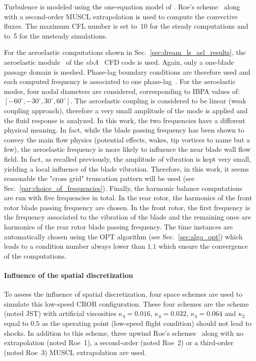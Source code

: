 Turbulence is modeled using the one-equation model of
\citet{Spalart1992}.  Roe's scheme~\cite{Roe1981} along with a 
second-order MUSCL extrapolation 
is used to compute the convective fluxes.
The maximum CFL number is set to~10 for the steady 
computations and to~5 for the unsteady simulations.

For the aeroelastic computations shown in
Sec.~\ref{sec:dream_ls_ael_results}, 
the aeroelastic module~\cite{CIDugeai2011} 
of the \textit{elsA}~\cite{Cambier2013} CFD code is used.
Again, only a one-blade passage domain is meshed.
Phase-lag boundary conditions are therefore used
and each computed frequency is associated to one phase-lag~\cite{ThesisGuedeney}.
For the aeroelastic modes, 
four nodal diameters are considered, corresponding to IBPA
values of: $[-60^\circ, -30^\circ, 30^\circ, 60^\circ]$. 
The aeroelastic coupling is considered to be linear (weak coupling
approach), therefore a very small amplitude of the mode is applied
and the fluid response is analyzed.
In this work, the two frequencies 
have a different physical meaning. In fact, while the blade passing frequency
has been shown to convey the main flow physics (potential effects, wakes, 
tip vortices to name but a few), the aeroelastic frequency is more likely
to influence the near blade wall flow field. In fact, as recalled
previously, the amplitude of vibration is kept very small,
yielding a local influence of the blade vibration.
Therefore, in this work, it seems reasonable the "cross grid"
truncation pattern will be used (see Sec.~\ref{par:choice_of_frequencies}).
Finally, the harmonic balance computations are run with
five frequencies in total. In the rear rotor,
the harmonics of the front rotor blade passing frequency
are chosen. In the front rotor, the first frequency is the
frequency associated to the vibration of the blade and the
remaining ones are harmonics of the rear rotor blade 
passing frequency.
The time instances are automatically chosen using the OPT
algorithm (see Sec.~\ref{sec:algo_opt}) which leads to 
a condition number always lower than $1.1$ which ensure
the convergence of the computations.

\paragraph{Influence of the spatial discretization}
\label{sub:dream_ls_spatial_discretization}

To assess the influence of spatial discretization, four 
space schemes are used to simulate this low-speed CROR configuration.
These four schemes are the \citet{Jameson1981} scheme (noted JST) with artificial
viscosities $\kappa_4 = 0.016$, $\kappa_4 = 0.032$, $\kappa_4 = 0.064$
and $\kappa_2$ equal to $0.5$ as the operating point (low-speed
flight condition) should not 
lead to shocks. In addition to this scheme, three upwind
Roe's schemes~\cite{Roe1981} along with no extrapolation (noted Roe~1),
a second-order (noted Roe~2) or a third-order (noted Roe~3) 
MUSCL extrapolation are used.

